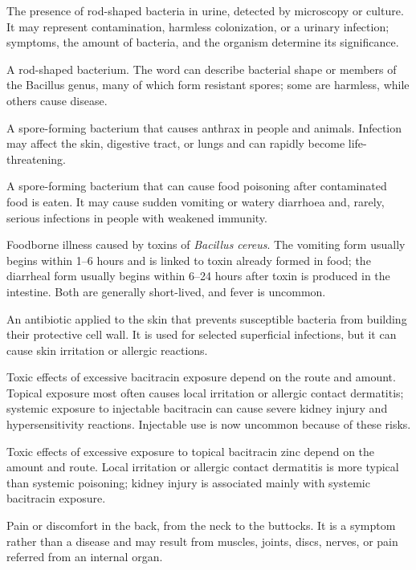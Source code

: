 The presence of rod-shaped bacteria in urine, detected by microscopy or culture. It may represent contamination, harmless colonization, or a urinary infection; symptoms, the amount of bacteria, and the organism determine its significance.

 A rod-shaped bacterium. The word can describe bacterial shape or members of the Bacillus genus, many of which form resistant spores; some are harmless, while others cause disease.

 A spore-forming bacterium that causes anthrax in people and animals. Infection may affect the skin, digestive tract, or lungs and can rapidly become life-threatening.

 A spore-forming bacterium that can cause food poisoning after contaminated food is eaten. It may cause sudden vomiting or watery diarrhoea and, rarely, serious infections in people with weakened immunity.

 Foodborne illness caused by toxins of \textit{Bacillus cereus}. The vomiting form usually begins within 1--6 hours and is linked to toxin already formed in food; the diarrheal form usually begins within 6--24 hours after toxin is produced in the intestine. Both are generally short-lived, and fever is uncommon.

 An antibiotic applied to the skin that prevents susceptible bacteria from building their protective cell wall. It is used for selected superficial infections, but it can cause skin irritation or allergic reactions.

 Toxic effects of excessive bacitracin exposure depend on the route and amount. Topical exposure most often causes local irritation or allergic contact dermatitis; systemic exposure to injectable bacitracin can cause severe kidney injury and hypersensitivity reactions. Injectable use is now uncommon because of these risks.

 Toxic effects of excessive exposure to topical bacitracin zinc depend on the amount and route. Local irritation or allergic contact dermatitis is more typical than systemic poisoning; kidney injury is associated mainly with systemic bacitracin exposure.

 Pain or discomfort in the back, from the neck to the buttocks. It is a symptom rather than a disease and may result from muscles, joints, discs, nerves, or pain referred from an internal organ.

